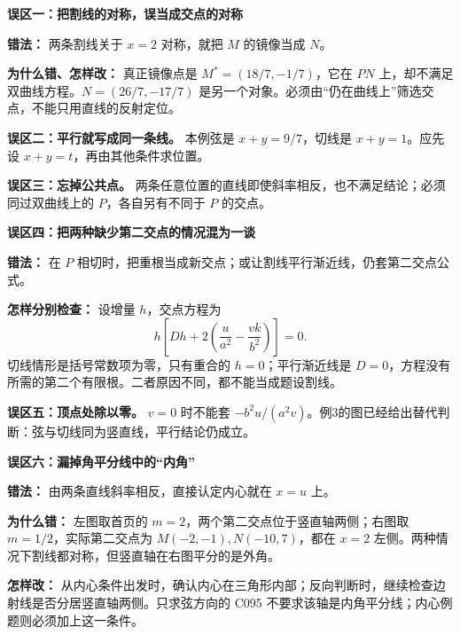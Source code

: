 \clearpage
\begin{trapbox}
\textbf{误区一：把割线的对称，误当成交点的对称}

\begin{center}

\end{center}

\textbf{错法：} 两条割线关于 $x=2$ 对称，就把 $M$ 的镜像当成 $N$。

\textbf{为什么错、怎样改：} 真正镜像点是 $M^*=(18/7,-1/7)$，它在 $PN$ 上，却不满足双曲线方程。$N=(26/7,-17/7)$ 是另一个对象。必须由“仍在曲线上”筛选交点，不能只用直线的反射定位。

\medskip
\textbf{误区二：平行就写成同一条线。} 本例弦是 $x+y=9/7$，切线是 $x+y=1$。应先设 $x+y=t$，再由其他条件求位置。

\medskip
\textbf{误区三：忘掉公共点。} 两条任意位置的直线即使斜率相反，也不满足结论；必须同过双曲线上的 $P$，各自另有不同于 $P$ 的交点。
\end{trapbox}

\clearpage
\begin{trapbox}
\textbf{误区四：把两种缺少第二交点的情况混为一谈}

\begin{center}

\end{center}

\textbf{错法：} 在 $P$ 相切时，把重根当成新交点；或让割线平行渐近线，仍套第二交点公式。

\textbf{怎样分别检查：} 设增量 $h$，交点方程为
\[
h\left[Dh+2\left(\frac{u}{a^2}-\frac{vk}{b^2}\right)\right]=0.
\]
切线情形是括号常数项为零，只有重合的 $h=0$；平行渐近线是 $D=0$，方程没有所需的第二个有限根。二者原因不同，都不能当成题设割线。

\medskip
\textbf{误区五：顶点处除以零。} $v=0$ 时不能套 $-b^2u/(a^2v)$。例3的图已经给出替代判断：弦与切线同为竖直线，平行结论仍成立。
\end{trapbox}

\clearpage
\begin{trapbox}
\textbf{误区六：漏掉角平分线中的“内角”}

\begin{center}

\end{center}

\textbf{错法：} 由两条直线斜率相反，直接认定内心就在 $x=u$ 上。

\textbf{为什么错：} 左图取首页的 $m=2$，两个第二交点位于竖直轴两侧；右图取 $m=1/2$，实际第二交点为 $M(-2,-1),N(-10,7)$，都在 $x=2$ 左侧。两种情况下割线都对称，但竖直轴在右图平分的是外角。

\textbf{怎样改：} 从内心条件出发时，确认内心在三角形内部；反向判断时，继续检查边射线是否分居竖直轴两侧。只求弦方向的 C095 不要求该轴是内角平分线；内心例题则必须加上这一条件。
\end{trapbox}
